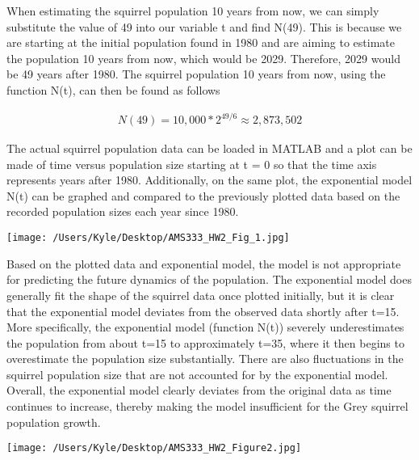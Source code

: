 \documentclass[12pt]{article}
\begin{document}
When estimating the squirrel population 10 years from now, we can simply substitute the value of 49 into our variable t and find N(49). This is because we are starting at the initial population found in 1980 and are aiming to estimate the population 10 years from now, which would be 2029. Therefore, 2029 would be 49 years after 1980. The squirrel population 10 years from now, using the function N(t), can then be found as follows 

\begin{gather*}
N(49) = 10,000*2^{49/6} \approx 2,873,502	
\end{gather*}

The actual squirrel population data can be loaded in MATLAB and a plot can be made of time versus population size starting at t = 0 so that the time axis represents years after 1980. Additionally, on the same plot, the exponential model N(t) can be graphed and compared to the previously plotted data based on the recorded population sizes each year since 1980. 
\begin{center}
   \texttt{[image: /Users/Kyle/Desktop/AMS333\_HW2\_Fig\_1.jpg]}
\end{center}

Based on the plotted data and exponential model, the model is not appropriate for predicting the future dynamics of the population. The exponential model does generally fit the shape of the squirrel data once plotted initially, but it is clear that the exponential model deviates from the observed data shortly after t=15. More specifically, the exponential model (function N(t)) severely underestimates the population from about t=15 to approximately t=35, where it then begins to overestimate the population size substantially. There are also fluctuations in the squirrel population size that are not accounted for by the exponential model. Overall, the exponential model clearly deviates from the original data as time continues to increase, thereby making the model insufficient for the Grey squirrel population growth.\\

\begin{center}
   \texttt{[image: /Users/Kyle/Desktop/AMS333\_HW2\_Figure2.jpg]}
\end{center}\
\end{document}
